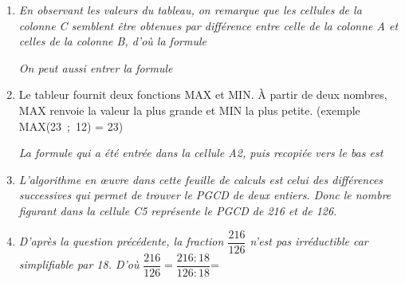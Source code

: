 \documentclass[10pt]{article}
\begin{document}
\begin{enumerate}
\item \textit{En observant les valeurs du tableau, on remarque que les cellules de la colonne C semblent être obtenues par différence entre celle de la colonne A et celles de la colonne B, d'où la formule }

\textit{On peut aussi entrer la formule }
 
\item %

 
Le tableur fournit deux fonctions MAX et MIN. À partir de deux nombres, MAX renvoie la valeur la plus grande et MIN la plus petite. (exemple MAX(23~;~12) = 23)

\textit{La formule qui a été entrée dans la cellule A2, puis recopiée vers le bas est  }
\item \textit{L'algorithme en \oe uvre dans cette feuille de calculs est celui des différences successives qui permet de trouver le PGCD de deux entiers. Donc le nombre figurant dans la cellule C5 représente le PGCD de 216 et de 126.} 
\item \textit{D'après la question précédente, la fraction $\dfrac{216}{126}$ n'est pas irréductible car simplifiable par 18. D'où} $\dfrac{216}{126}=\dfrac{216:18}{126:18}$= 
\end{enumerate}
 
\vspace{0,5cm}
\end{document}
